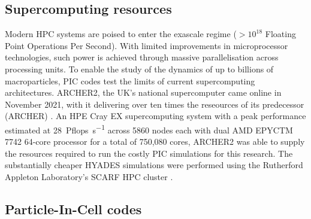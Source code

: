 \subsection{Supercomputing resources}\label{sec:intro-archer}
Modern \ac{HPC} systems are poised to enter the exascale regime ($> 10^{18}$ Floating Point Operations Per Second). With limited improvements in microprocessor technologies, such power is achieved through massive parallelisation across processing units. To enable the study of the dynamics of up to billions of macroparticles, PIC codes test the limits of current supercomputing architectures. ARCHER2, the UK's national supercomputer came online in November 2021, with it delivering over ten times the reseources of its predecessor (ARCHER) \cite{ARCHER2}. An HPE Cray EX supercomputing system with a peak performance estimated at \qty{28}{Pflops.s^{-1}} across 5860 nodes each with dual AMD EPYCTM 7742 64-core processor for a total of 750,080 cores, ARCHER2 was able to supply the resources required to run the costly PIC simulations for this research. The substantially cheaper HYADES simulations were performed using the Rutherford Appleton Laboratory's SCARF \ac{HPC} cluster \cite{SCARFOverview}.

\subsection{Particle-In-Cell codes}
